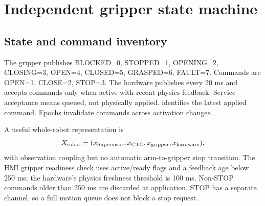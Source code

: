 \documentclass[11pt,a4paper]{report}
\newcommand{\id}[1]{\texttt{\small\detokenize{#1}}}
\begin{document}
\section{Independent gripper state machine}
\subsection{State and command inventory}
The gripper publishes BLOCKED=0, STOPPED=1, OPENING=2, CLOSING=3, OPEN=4, CLOSED=5, GRASPED=6, FAULT=7. Commands are OPEN=1, CLOSE=2, STOP=3. The hardware publishes every 20 ms and accepts commands only when active with recent physics feedback. Service acceptance means queued, not physically applied. \id{applied_sequence} identifies the latest applied command. Epochs invalidate commands across activation changes.

A useful whole-robot representation is
\begin{equation}
 X_{\rm robot}=(x_{\rm Supervisor},x_{\rm CTC},x_{\rm gripper},x_{\rm hardware}),
\end{equation}
with observation coupling but no automatic arm-to-gripper stop transition. The HMI gripper readiness check uses active/ready flags and a feedback age below 250 ms; the hardware's physics freshness threshold is 100 ms. Non-STOP commands older than 250 ms are discarded at application. STOP has a separate channel, so a full motion queue does not block a stop request.
\end{document}
